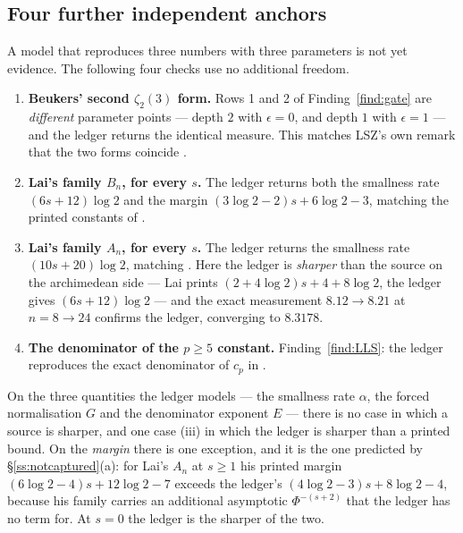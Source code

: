 \subsection{Four further independent anchors}\label{ss:anchors}

A model that reproduces three numbers with three parameters is not yet evidence. The
following four checks use no additional freedom.

\begin{enumerate}[label=\textup{(\roman*)},leftmargin=2.6em,itemsep=4pt]
\item \textbf{Beukers' second $\zeta_2(3)$ form.} Rows 1 and 2 of Finding~\ref{find:gate} are
      \emph{different} parameter points --- depth $2$ with $\epsilon=0$, and depth $1$ with
      $\epsilon=1$ --- and the ledger returns the identical measure. This matches LSZ's own
      remark that the two forms coincide \cite[Final remarks]{LSZ2025}. 

\item \textbf{Lai's family $B_n$, for every $s$.} The ledger returns both the smallness rate
      $(6s+12)\log2$ and the margin $(3\log2-2)s+6\log2-3$, matching the printed constants of
      \cite{Lai2025}. 

\item \textbf{Lai's family $A_n$, for every $s$.} The ledger returns the smallness rate
      $(10s+20)\log2$, matching \cite{Lai2025}. Here the ledger is \emph{sharper} than the
      source on the archimedean side --- Lai prints $(2+4\log2)s+4+8\log2$, the ledger gives
      $(6s+12)\log2$ --- and the exact measurement $8.12\to8.21$ at $n=8\to24$ confirms the
      ledger, converging to $8.3178$. 

\item \textbf{The denominator of the $p\ge5$ constant.} Finding~\ref{find:LLS}: the ledger
      reproduces the exact denominator of $c_p$ in \cite[Thm.~1.1]{LLS2025}.
      \DERIVED{}
\end{enumerate}

On the three quantities the ledger models --- the smallness rate $\alpha$, the forced
normalisation $G$ and the denominator exponent $E$ --- there is no case in which a source
is sharper, and one case (iii) in which the ledger is sharper than a printed bound. On the
\emph{margin} there is one exception, and it is the one predicted by
\S\ref{ss:notcaptured}(a): for Lai's $A_n$ at $s\ge1$ his printed margin
$(6\log2-4)s+12\log2-7$ exceeds the ledger's $(4\log2-3)s+8\log2-4$, because his family
carries an additional asymptotic $\Phi^{-(s+2)}$ that the ledger has no term for. At $s=0$
the ledger is the sharper of the two.

